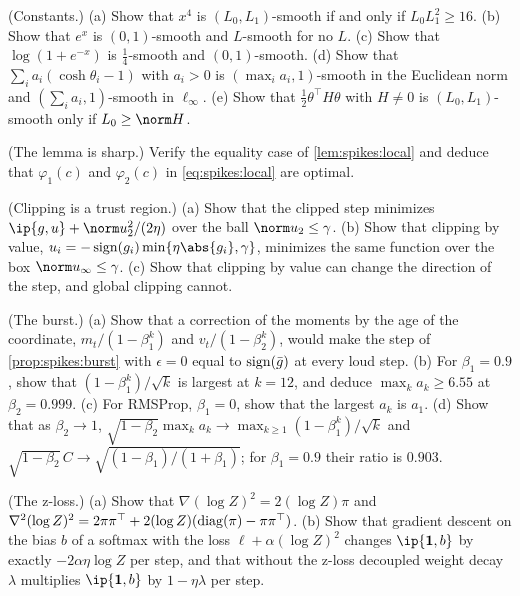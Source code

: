 \begin{refsection}
\begin{exercises}
\item \consolidation (Constants.) (a) Show that $x^4$ is $(L_0,L_1)$-smooth if and only if $L_0L_1^2\ge16$. (b) Show that $e^x$ is $(0,1)$-smooth and $L$-smooth for no $L$. (c) Show that $\log(1+e^{-x})$ is $\frac14$-smooth and $(0,1)$-smooth. (d) Show that $\sum_ia_i(\cosh\theta_i-1)$ with $a_i>0$ is $(\max_ia_i,1)$-smooth in the Euclidean norm and $(\sum_ia_i,1)$-smooth in $\ell_\infty$. (e) Show that $\frac12\theta^\top H\theta$ with $H\ne0$ is $(L_0,L_1)$-smooth only if $L_0\ge\norm H$. \label{ex:spikes:constants}

\item \consolidation (The lemma is sharp.) Verify the equality case of \cref{lem:spikes:local} and deduce that $\varphi_1(c)$ and $\varphi_2(c)$ in \eqref{eq:spikes:local} are optimal.\label{ex:spikes:sharp}

\item \consolidation (Clipping is a trust region.) (a) Show that the clipped step minimizes $\ip{g,u}+\norm u_2^2/(2\eta)$ over the ball $\norm u_2\le\gamma$. (b) Show that clipping by value, $u_i=-\sign(g_i)\min\{\eta\abs{g_i},\gamma\}$, minimizes the same function over the box $\norm u_\infty\le\gamma$. (c) Show that clipping by value can change the direction of the step, and global clipping cannot.\label{ex:spikes:trust}

\item \consolidation\hard (The burst.) (a) Show that a correction of the moments by the age of the coordinate, $m_t/(1-\beta_1^k)$ and $v_t/(1-\beta_2^k)$, would make the step of \cref{prop:spikes:burst} with $\epsilon=0$ equal to $\operatorname{sign}(\bar g)$ at every loud step. (b) For $\beta_1=0.9$, show that $(1-\beta_1^k)/\sqrt k$ is largest at $k=12$, and deduce $\max_ka_k\ge6.55$ at $\beta_2=0.999$. (c) For RMSProp, $\beta_1=0$, show that the largest $a_k$ is $a_1$. (d) Show that as $\beta_2\to1$, $\sqrt{1-\beta_2}\max_ka_k\to\max_{k\ge1}(1-\beta_1^k)/\sqrt k$ and $\sqrt{1-\beta_2}\,C\to\sqrt{(1-\beta_1)/(1+\beta_1)}$; for $\beta_1=0.9$ their ratio is $0.903$. \label{ex:spikes:burst}

\item \consolidation (The z-loss.) (a) Show that $\nabla(\log Z)^2=2(\log Z)\pi$ and $\nabla^2(\log Z)^2=2\pi\pi^\top+2(\log Z)(\operatorname{diag}(\pi)-\pi\pi^\top)$. (b) Show that gradient descent on the bias $b$ of a softmax with the loss $\ell+\alpha(\log Z)^2$ changes $\ip{\mathbf1,b}$ by exactly $-2\alpha\eta\log Z$ per step, and that without the z-loss decoupled weight decay $\lambda$ multiplies $\ip{\mathbf1,b}$ by $1-\eta\lambda$ per step.\label{ex:spikes:zgrad}


\end{exercises}
\end{refsection}

